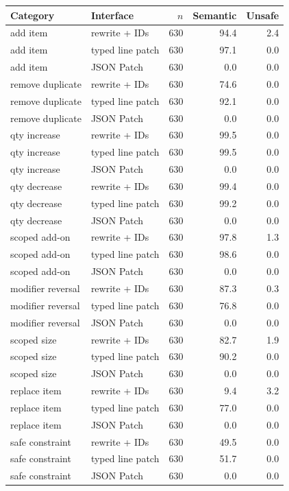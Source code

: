 \begin{tabular}{llrrr}
\toprule
Category & Interface & $n$ & Semantic & Unsafe \\
\midrule
add item & rewrite + IDs & 630 & 94.4 & 2.4 \\
add item & typed line patch & 630 & 97.1 & 0.0 \\
add item & JSON Patch & 630 & 0.0 & 0.0 \\
remove duplicate & rewrite + IDs & 630 & 74.6 & 0.0 \\
remove duplicate & typed line patch & 630 & 92.1 & 0.0 \\
remove duplicate & JSON Patch & 630 & 0.0 & 0.0 \\
qty increase & rewrite + IDs & 630 & 99.5 & 0.0 \\
qty increase & typed line patch & 630 & 99.5 & 0.0 \\
qty increase & JSON Patch & 630 & 0.0 & 0.0 \\
qty decrease & rewrite + IDs & 630 & 99.4 & 0.0 \\
qty decrease & typed line patch & 630 & 99.2 & 0.0 \\
qty decrease & JSON Patch & 630 & 0.0 & 0.0 \\
scoped add-on & rewrite + IDs & 630 & 97.8 & 1.3 \\
scoped add-on & typed line patch & 630 & 98.6 & 0.0 \\
scoped add-on & JSON Patch & 630 & 0.0 & 0.0 \\
modifier reversal & rewrite + IDs & 630 & 87.3 & 0.3 \\
modifier reversal & typed line patch & 630 & 76.8 & 0.0 \\
modifier reversal & JSON Patch & 630 & 0.0 & 0.0 \\
scoped size & rewrite + IDs & 630 & 82.7 & 1.9 \\
scoped size & typed line patch & 630 & 90.2 & 0.0 \\
scoped size & JSON Patch & 630 & 0.0 & 0.0 \\
replace item & rewrite + IDs & 630 & 9.4 & 3.2 \\
replace item & typed line patch & 630 & 77.0 & 0.0 \\
replace item & JSON Patch & 630 & 0.0 & 0.0 \\
safe constraint & rewrite + IDs & 630 & 49.5 & 0.0 \\
safe constraint & typed line patch & 630 & 51.7 & 0.0 \\
safe constraint & JSON Patch & 630 & 0.0 & 0.0 \\

\end{tabular}
